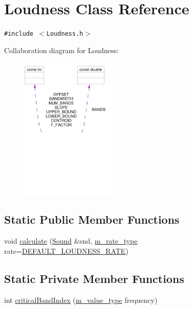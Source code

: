 \hypertarget{classLoudness}{
\section{Loudness Class Reference}
\label{classLoudness}
}
{\tt \#include $<$Loudness.h$>$}

Collaboration diagram for Loudness:\begin{figure}[H]
\begin{center}
\leavevmode
\includegraphics[width=128pt]{classLoudness__coll__graph}
\end{center}
\end{figure}
\subsection*{Static Public Member Functions}
\begin{CompactItemize}
\item 
void \hyperlink{classLoudness_e0}{calculate} (\hyperlink{classSound}{Sound} \&snd, \hyperlink{Types_8h_a4}{m\_\-rate\_\-type} rate=\hyperlink{Types_8h_a6}{DEFAULT\_\-LOUDNESS\_\-RATE})
\end{CompactItemize}
\subsection*{Static Private Member Functions}
\begin{CompactItemize}
\item 
int \hyperlink{classLoudness_h0}{critical\-Band\-Index} (\hyperlink{Types_8h_a3}{m\_\-value\_\-type} frequency)
\end{CompactItemize}
